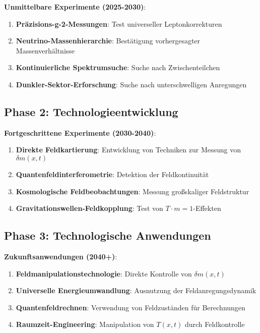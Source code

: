 \documentclass[12pt,a4paper]{article}
\newcommand{\deltam}{\delta m}
\begin{document}
	\textbf{Unmittelbare Experimente (2025-2030)}:
	
	\begin{enumerate}
		\item \textbf{Präzisions-g-2-Messungen}: Test universeller Leptonkorrekturen
		\item \textbf{Neutrino-Massenhierarchie}: Bestätigung vorhergesagter Massenverhältnisse
		\item \textbf{Kontinuierliche Spektrumsuche}: Suche nach Zwischenteilchen
		\item \textbf{Dunkler-Sektor-Erforschung}: Suche nach unterschwelligen Anregungen
	\end{enumerate}
	
	\subsection{Phase 2: Technologieentwicklung}
	
	\textbf{Fortgeschrittene Experimente (2030-2040)}:
	
	\begin{enumerate}
		\item \textbf{Direkte Feldkartierung}: Entwicklung von Techniken zur Messung von $\deltam(x,t)$
		\item \textbf{Quantenfeldinterferometrie}: Detektion der Feldkontinuität
		\item \textbf{Kosmologische Feldbeobachtungen}: Messung großskaliger Feldstruktur
		\item \textbf{Gravitationswellen-Feldkopplung}: Test von $T \cdot m = 1$-Effekten
	\end{enumerate}
	
	\subsection{Phase 3: Technologische Anwendungen}
	
	\textbf{Zukunftsanwendungen (2040+)}:
	
	\begin{enumerate}
		\item \textbf{Feldmanipulationstechnologie}: Direkte Kontrolle von $\deltam(x,t)$
		\item \textbf{Universelle Energieumwandlung}: Ausnutzung der Feldanregungsdynamik
		\item \textbf{Quantenfeldrechnen}: Verwendung von Feldzuständen für Berechnungen
		\item \textbf{Raumzeit-Engineering}: Manipulation von $T(x,t)$ durch Feldkontrolle
	\end{enumerate}
	
\end{document}
